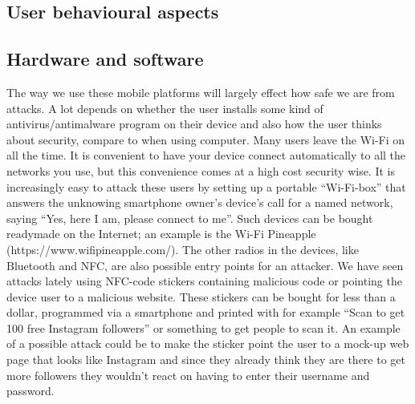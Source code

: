 \subsection{User behavioural aspects}
\subsection{Hardware and software}
The way we use these mobile platforms will largely effect how safe we are from attacks. A lot depends on whether the user installs some kind of antivirus/antimalware program on their device and also how the user thinks about security, compare to when using computer.
Many users leave the Wi-Fi on all the time. It is convenient to have your device connect automatically to all the networks you use, but this convenience comes at a high cost security wise. It is increasingly easy to attack these users by setting up a portable “Wi-Fi-box” that answers the unknowing smartphone owner’s device’s call for a named network, saying “Yes, here I am, please connect to me”. Such devices can be bought readymade on the Internet; an example is the Wi-Fi Pineapple (https://www.wifipineapple.com/).
The other radios in the devices, like Bluetooth and NFC, are also possible entry points for an attacker. We have seen attacks lately using NFC-code stickers containing malicious code or pointing the device user to a malicious website. These stickers can be bought for less than a dollar, programmed via a smartphone and printed with for example “Scan to get 100 free Instagram followers” or something to get people to scan it. An example of a possible attack could be to make the sticker point the user to a mock-up web page that looks like Instagram and since they already think they are there to get more followers they wouldn’t react on having to enter their username and password. 
